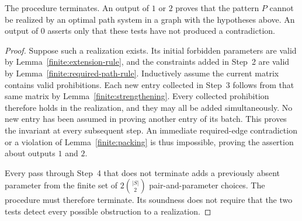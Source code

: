 \begin{proposition}
\label{finite:procedure-soundness}
The procedure terminates.  An output of $1$ or $2$ proves that the
pattern $P$ cannot be realized by an optimal path system in a graph
with the hypotheses above.  An output of $0$ asserts only that these
tests have not produced a contradiction.
\end{proposition}

\begin{proof}
Suppose such a realization exists.  Its initial forbidden parameters
are valid by Lemma~\ref{finite:extension-rule}, and the constraints
added in Step~2 are valid by Lemma~\ref{finite:required-path-rule}.
Inductively assume the current matrix contains valid prohibitions.
Each new entry collected in Step~3 follows from that same matrix by
Lemma~\ref{finite:strengthening}.  Every collected prohibition
therefore holds in the realization, and they may all be added
simultaneously.  No new entry has been assumed in proving another
entry of its batch.
This proves the invariant at every subsequent step.
An immediate required-edge contradiction or a violation of
Lemma~\ref{finite:packing} is thus impossible, proving the assertion
about outputs $1$ and $2$.

Every pass through Step~4 that does not terminate adds a previously
absent parameter from the finite set of
$2\binom{|S|}{2}$ pair-and-parameter choices.
The procedure must therefore terminate.
Its soundness does not require that the two tests detect every
possible obstruction to a realization.
\end{proof}
